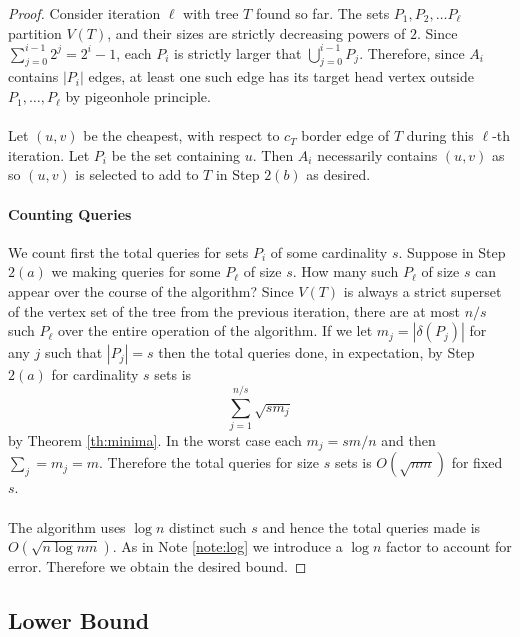 \begin{proof}
Consider iteration $\ell$ with tree $T$ found so far. The sets $P_1, P_2, \dots P_{\ell}$ partition $V(T)$, and their sizes are strictly decreasing powers of $2$. Since $\sum_{j=0}^{i-1} 2^j = 2^i - 1$, each $P_i$ is strictly larger that $\bigcup_{j=0}^{i-1} P_j$. Therefore, since $A_i$ contains  $|P_i|$ edges, at least one such edge has its target head vertex outside $P_1, \dots, P_\ell$ by pigeonhole principle.
\paragraph{}
Let $(u,v)$ be the cheapest, with respect to $c_T$ border edge of $T$ during this $\ell$-th iteration. Let $P_i$ be the set containing $u$. Then $A_i$ necessarily contains $(u,v)$ as so $(u,v)$ is selected to add to $T$ in Step $2(b)$ as desired. 
\paragraph{Counting Queries}
We count first the total queries for sets $P_i$ of some cardinality $s$. Suppose in Step $2(a)$ we making queries for some $P_\ell$ of size $s$. How many such $P_\ell$ of size $s$ can appear over the course of the algorithm? Since $V(T)$ is always a strict superset of the vertex set of the tree from the previous iteration, there are at most $n/s$ such $P_\ell$ over the entire operation of the algorithm. If we let $m_j = |\delta(P_j)|$ for any $j$ such that $|P_j| = s$ then the total queries done, in expectation, by Step $2(a)$ for cardinality $s$ sets is
$$\sum_{j=1}^{n/s} \sqrt{sm_j}$$
by Theorem \ref{th:minima}.
In the worst case each $m_j = sm/n$ and then $\sum_j = m_j = m$. Therefore the total queries for size $s$ sets is $O(\sqrt{nm})$ for fixed $s$.
\paragraph{}
The algorithm uses $\log n$ distinct such $s$ and hence the total queries made is $O(\sqrt{n\log n m})$. As in Note \ref{note:log} we introduce a $\log n$ factor to account for error. Therefore we obtain the desired bound.
\end{proof}
\subsection{Lower Bound}
